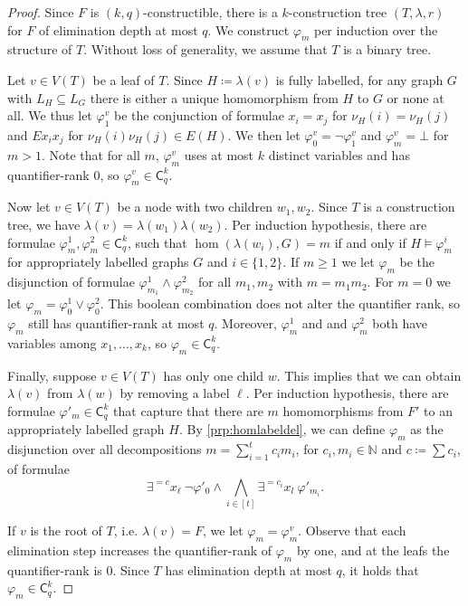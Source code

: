 \documentclass[a4paper,UKenglish,cleveref, autoref, thm-restate]{lipics-v2021}
\renewcommand{\phi}{\varphi}
\newcommand{\N}{\ensuremath{\mathbb{N}}}
\newcommand{\lC} {\ensuremath{\mathsf C}}
\newcommand{\elimOrd}[2]{$(#1,#2)$-constructible}
\newcommand{\elimDepth}{elimination depth}
\begin{document}
\begin{proof}
    Since $F$ is \elimOrd{k}{q}, there is a $k$-construction tree $(T, \lambda, r)$ for $F$ of \elimDepth{} at most $q$. We construct $\phi_m$ per induction over the structure of $T$. Without loss of generality, we assume that $T$ is a binary tree.

    Let $v \in V(T)$ be a leaf of $T$. Since $H \coloneqq \lambda(v)$ is fully labelled, for any graph $G$ with $L_{H} \subseteq L_G$ there is either a unique homomorphism from $H$ to
$G$ or none at all. We thus let $\phi_1^v$ be the conjunction of formulae $x_i = x_j$ for $\nu_{H}(i) = \nu_{H}(j)$ and $Ex_ix_j$ for $\nu_{H}(i)\nu_{H}(j) \in E(H)$. We then let $\phi^v_0 = \neg \phi^v_1$ and $\phi^v_m = \bot$ for $m > 1$. Note that for all $m$, $\phi^v_m$ uses at most $k$ distinct variables and has quantifier-rank $0$, so $\phi_m^v \in \lC^k_q$.

    Now let $v \in V(T)$ be a node with two children $w_1, w_2$. Since $T$ is a construction tree, we have $\lambda(v) = \lambda(w_1)\lambda(w_2)$. Per induction hypothesis, there are formulae $\phi^1_m, \phi^2_m \in \lC^k_q$, such that $\hom(\lambda(w_i), G) = m$ if and only if $H \models \phi^i_m$ for appropriately labelled graphs $G$ and $i \in \{1,2\}$. If $m \geq 1$ we let $\phi_m$ be the disjunction of formulae $\phi^1_{m_1} \land \phi^2_{m_2}$ for all $m_1, m_2$ with $m = m_1m_2$. For $m = 0$ we let $\phi_m = \phi^1_0 \lor \phi^2_0$. This boolean combination does not alter the quantifier rank, so $\phi_m$ still has quantifier-rank at most $q$. Moreover, $\phi^1_m$ and and $\phi^2_m$ both have variables among $x_1, \dots, x_k$, so $\phi_m \in \lC^k_q$.

    Finally, suppose $v \in V(T)$ has only one child $w$. This implies that we can obtain $\lambda(v)$ from $\lambda(w)$ by removing a label $\ell$. Per induction hypothesis, there are formulae $\phi'_m \in \lC^k_q$ that capture that there are $m$ homomorphisms from $F'$ to an appropriately labelled graph $H$. By \cref{prp:homlabeldel}, we can define $\phi_m$ as the disjunction over all decompositions $m = \sum_{i=1}^t c_im_i$, for $c_i, m_i \in \N$ and $c \coloneqq \sum c_i$, of formulae
    \begin{equation*}
      \exists^{= c} x_\ell ~\neg\phi'_0 \land \bigwedge_{i \in [t]} \exists^{=c_i}x_l ~\phi'_{m_i}.
\end{equation*}

    If $v$ is the root of $T$, i.e. $\lambda(v) = F$, we let $\phi_m = \phi_m^v$.
    Observe that each elimination step increases the quantifier-rank of $\phi_m$ by one, and at the leafs the quantifier-rank is 0. Since $T$ has \elimDepth{} at most $q$, it holds that $\phi_m \in \lC^k_q$.
  \end{proof}
\end{document}

